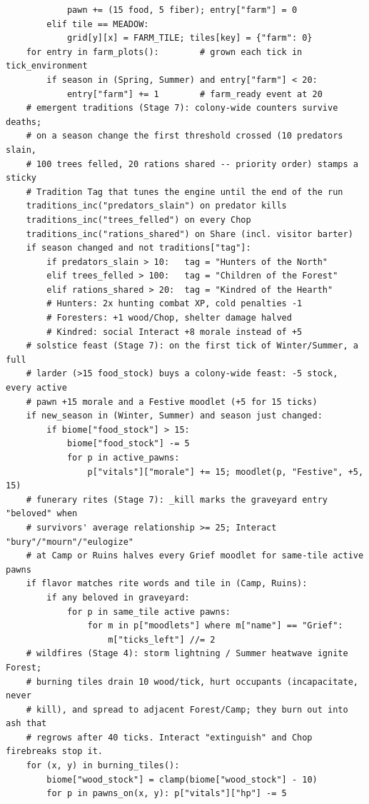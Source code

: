\documentclass[10pt,a4paper]{article}
\begin{document}
\begin{lstlisting}
            pawn += (15 food, 5 fiber); entry["farm"] = 0
        elif tile == MEADOW:
            grid[y][x] = FARM_TILE; tiles[key] = {"farm": 0}
    for entry in farm_plots():        # grown each tick in tick_environment
        if season in (Spring, Summer) and entry["farm"] < 20:
            entry["farm"] += 1        # farm_ready event at 20
    # emergent traditions (Stage 7): colony-wide counters survive deaths;
    # on a season change the first threshold crossed (10 predators slain,
    # 100 trees felled, 20 rations shared -- priority order) stamps a sticky
    # Tradition Tag that tunes the engine until the end of the run
    traditions_inc("predators_slain") on predator kills
    traditions_inc("trees_felled") on every Chop
    traditions_inc("rations_shared") on Share (incl. visitor barter)
    if season changed and not traditions["tag"]:
        if predators_slain > 10:   tag = "Hunters of the North"
        elif trees_felled > 100:   tag = "Children of the Forest"
        elif rations_shared > 20:  tag = "Kindred of the Hearth"
        # Hunters: 2x hunting combat XP, cold penalties -1
        # Foresters: +1 wood/Chop, shelter damage halved
        # Kindred: social Interact +8 morale instead of +5
    # solstice feast (Stage 7): on the first tick of Winter/Summer, a full
    # larder (>15 food_stock) buys a colony-wide feast: -5 stock, every active
    # pawn +15 morale and a Festive moodlet (+5 for 15 ticks)
    if new_season in (Winter, Summer) and season just changed:
        if biome["food_stock"] > 15:
            biome["food_stock"] -= 5
            for p in active_pawns:
                p["vitals"]["morale"] += 15; moodlet(p, "Festive", +5, 15)
    # funerary rites (Stage 7): _kill marks the graveyard entry "beloved" when
    # survivors' average relationship >= 25; Interact "bury"/"mourn"/"eulogize"
    # at Camp or Ruins halves every Grief moodlet for same-tile active pawns
    if flavor matches rite words and tile in (Camp, Ruins):
        if any beloved in graveyard:
            for p in same_tile active pawns:
                for m in p["moodlets"] where m["name"] == "Grief":
                    m["ticks_left"] //= 2
    # wildfires (Stage 4): storm lightning / Summer heatwave ignite Forest;
    # burning tiles drain 10 wood/tick, hurt occupants (incapacitate, never
    # kill), and spread to adjacent Forest/Camp; they burn out into ash that
    # regrows after 40 ticks. Interact "extinguish" and Chop firebreaks stop it.
    for (x, y) in burning_tiles():
        biome["wood_stock"] = clamp(biome["wood_stock"] - 10)
        for p in pawns_on(x, y): p["vitals"]["hp"] -= 5

\end{lstlisting}
\end{document}
